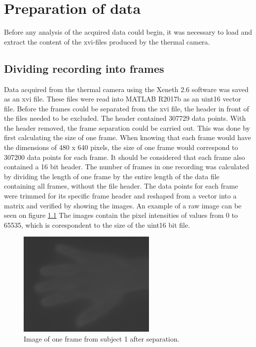 \chapter{Preparation of data}

Before any analysis of the acquired data could begin, it was necessary to load and extract the content of the xvi-files produced by the thermal camera.  

\section{Dividing recording into frames}

Data acquired from the thermal camera using the Xeneth 2.6 software was saved as an xvi file. These files were read into MATLAB R2017b as an uint16 vector file. Before the frames could be separated from the xvi file, the header in front of the files needed to be excluded. The header contained 307729 data points. With the header removed, the frame separation could be carried out. This was done by first calculating the size of one frame. When knowing that each frame would have the dimensions of 480 x 640 pixels, the size of one frame would correspond to 307200 data points for each frame. It should be considered that each frame also contained a 16 bit header. The number of frames in one recording was calculated by dividing the length of one frame by the entire length of the data file containing all frames, without the file header. The data points for each frame were trimmed for its specific frame header and reshaped from a vector into a matrix and verified by showing the images. An example of a raw image can be seen on figure \ref{fig:hand}
The images contain the pixel intensities of values from 0 to 65535, which is corespondent to the size of the uint16 bit file. 


\begin{figure}[H]
	\includegraphics[width=0.6\textwidth]{figures/uint16Hand}  %
	\caption{Image of one frame from subject 1 after separation.}
	\label{fig:hand}  %
\end{figure}